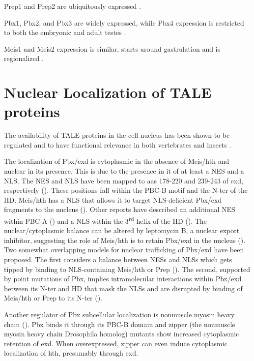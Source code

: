 Prep1 and Prep2 are ubiquitously expressed \parencite{Ferretti1999, Reymond2002, Ferretti2006}. 

Pbx1, Pbx2, and Pbx3 are widely expressed, while Pbx4 expression is restricted to both the embryonic and adult testes \parencite{Monica1991, Wagner2001}.

Meis1 and Meis2 expression is similar, starts around gastrulation and is regionalized \parencite{Cecconi1997, Oulad-Abdelghani1997, Tamplin2008}.



\section{Nuclear Localization of TALE proteins}
\label{sec:nuclearLoc}

The availability of \ac{TALE} proteins in the cell nucleus has been shown to be regulated and to have functional relevance in both vertebrates and insects \parencite{Mercader1999b}.

The localization of Pbx/exd is cytoplasmic in the absence of Meis/hth and nuclear in its presence. This is due to the presence in it of at least a \ac{NES} and a \ac{NLS}. The \ac{NES} and \ac{NLS} have been mapped to \acp{aa} 178-220 and 239-243 of exd, respectively (\cite{Abu-Shaar1999}). These positions fall within the PBC-B motif and the \ac{N-ter} of the \ac{HD}. Meis/hth has a \ac{NLS} that allows it to target \ac{NLS}-deficient Pbx/exd fragments to the nucleus (\cite{Abu-Shaar1999}). Other reports have described an additional \ac{NES} within PBC-A (\cite{Berthelsen1999}) and a \ac{NLS} within the 3\textsuperscript{rd} helix of the \ac{HD} (\cite{Saleh2000}). The nuclear/cytoplasmic balance can be altered by leptomycin B, a nuclear export inhibitor, suggesting the role of Meis/hth is to retain Pbx/exd in the nucleus (\cite{Berthelsen1999, Abu-Shaar1999}). Two somewhat overlapping models for nuclear trafficking of Pbx/exd have been proposed. The first considers a balance between \acp{NES} and \acp{NLS} which gets tipped by binding to \ac{NLS}-containing Meis/hth or Prep (\cite{Affolter1999}). The second, supported by point mutations of Pbx, implies intramolecular interactions within Pbx/exd between its \ac{N-ter} and \ac{HD} that mask the \acp{NLS} and are disrupted by binding of Meis/hth or Prep to its \ac{N-ter} (\cite{Saleh2000}).

Another regulator of Pbx subcellular localization is nonmuscle myosin heavy chain (\cite{Huang2003}). Pbx binds it through its PBC-B domain and zipper (the nonmuscle myosin heavy chain Drosophila homolog) mutants show increased cytoplasmic retention of \ac{exd}. When overexpressed, zipper can even induce cytoplasmic localization of \ac{hth}, presumably through \ac{exd}.

